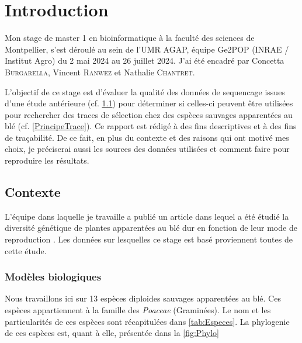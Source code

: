\documentclass[../main]{subfiles} %
\begin{document}
\addto\extrasfrench{\protected\edef:{\unexpanded\expandafter{:}}}



\section{Introduction}

Mon stage de master 1 en bioinformatique à la faculté des sciences de Montpellier, s’est déroulé au sein de 
l’UMR AGAP, équipe Ge2POP (INRAE / Institut Agro) du 2 mai 2024 au 26 juillet 2024. J’ai été encadré par Concetta \textsc{Burgarella}, Vincent \textsc{Ranwez} et Nathalie \textsc{Chantret}. 

L’objectif de ce stage est d’évaluer la qualité des données de \gls{sequencage} issues d’une étude antérieure (cf. \cref{Contexte}) pour déterminer si celles-ci peuvent être utilisées pour rechercher des traces de sélection chez des espèces sauvages apparentées au blé (cf. \cref{PrincipeTrace}). Ce rapport est rédigé à des fins descriptives et à des fins de traçabilité. De ce fait,  en plus du contexte et des raisons qui ont motivé mes choix, je préciserai aussi les sources des données utilisées et comment faire pour reproduire les résultats.

\subsection{Contexte}
\label{Contexte}
L’équipe dans laquelle je travaille a publié un article dans lequel a été étudié la diversité génétique de plantes apparentées au blé dur en fonction de leur mode de reproduction \cite{burgarella_mating_2024}. Les données sur lesquelles ce stage est basé proviennent toutes de cette étude.

\subsubsection{Modèles biologiques}
\label{model_bio}
Nous travaillons ici sur 13 espèces \glspl{diploide} sauvages apparentées au blé. Ces espèces appartiennent à la famille des \textit{Poaceae} (Graminées). Le nom et les particularités de ces espèces sont récapitulées dans \cref{tab:Especes}. La \gls{phylogenie} de ces espèces est, quant à elle, présentée dans la \cref{fig:Phylo}



\end{document}
